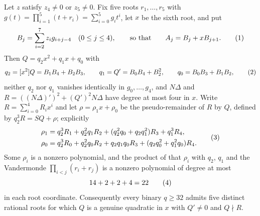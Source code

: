 \begin{lemma}\label{lem:m9-selector}%
%
Let $z$ satisfy $z_4\neq0$ or $z_5\neq0$.  Fix five roots $r_1,\ldots,r_5$
with $g(t)=\prod_{i=1}^5(t+r_i)=\sum_{i=0}^5g_it^i$, let $x$ be the sixth
root, and put
\[
 B_j=\sum_{i=2}^7z_ig_{i+j-4}\quad(0\leq j\leq4),
 \qquad\text{so that}\qquad A_j=B_j+xB_{j+1}.
 \autoeqtag{eq:m9-five-root-split}
\]
Then $Q=q_2x^2+q_1x+q_0$ with
\[
 q_2=[x^2]Q=B_1B_4+B_2B_3,\qquad
 q_1=Q'=B_0B_4+B_2^2,\qquad
 q_0=B_0B_3+B_1B_2,
 \autoeqtag{eq:m9-Q-coefficients}
\]
neither $q_2$ nor $q_1$ vanishes identically in $g_0,\ldots,g_4$, and
$N\Delta$ and $R=((N\Delta)')^2+(Q')^2N\Delta$ have degree at most four in
$x$.  Write $R=\sum_{i=0}^4R_ix^i$ and let $\rho=\rho_1x+\rho_0$ be the
pseudo-remainder of $R$ by $Q$, defined by $q_2^3R=SQ+\rho$; explicitly
\[
\begin{aligned}
 \rho_1&=q_2^3R_1+q_2^2q_1R_2+(q_2^2q_0+q_2q_1^2)R_3+q_1^3R_4,\\
 \rho_0&=q_2^3R_0+q_2^2q_0R_2+q_2q_1q_0R_3+(q_2q_0^2+q_1^2q_0)R_4 .
\end{aligned}
 \autoeqtag{eq:m9-pseudo-remainder}
\]
Some $\rho_i$ is a nonzero polynomial, and the product of that $\rho_i$ with
$q_2$, $q_1$ and the Vandermonde $\prod_{i<j}(r_i+r_j)$ is a nonzero
polynomial of degree at most
\[
 14+2+2+4=22
 \autoeqtag{eq:m9-selector-degree}
\]
in each root coordinate.  Consequently every binary $q\geq32$ admits five
distinct rational roots for which $Q$ is a genuine quadratic in $x$ with
$Q'\neq0$ and $Q\nmid R$.
\end{lemma}

